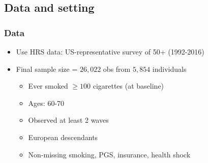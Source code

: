 \documentclass[10pt,compress,xcolor=dvipsnames,aspectratio=169]{beamer}    %
\newcommand{\1}[1]{\mathrm{1\hspace*{-2.5pt}l}[#1]}	%
\begin{document}
\subsection{Data and setting}
\begin{frame}
\frametitle{Data}%

\begin{itemize}
	\item Use HRS data: US-representative survey of 50+ (1992-2016)
	\item Final sample size = $26,022$ obs from $5,854$ individuals
	\begin{itemize}
		\item Ever smoked $\geq 100$ cigarettes (at baseline)
		\item Ages: 60-70
		\item Observed at least 2 waves
		\item European descendants
		\item Non-missing smoking, PGS, insurance, health shock
	\end{itemize}
\end{itemize}

\end{frame}
\end{document}
